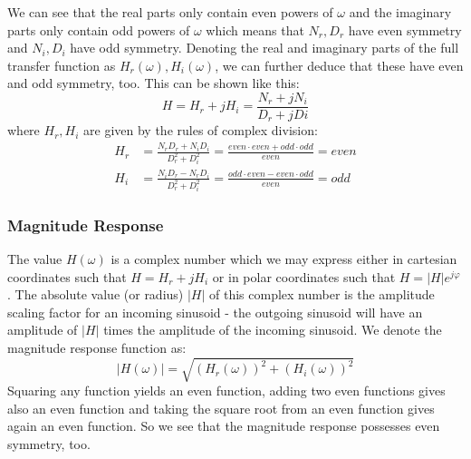 We can see that the real parts only contain even powers of $\omega$ and the imaginary parts only contain odd powers of $\omega$ which means that $N_r, D_r$ have even symmetry and $N_i, D_i$ have odd symmetry. Denoting the real and imaginary parts of the full transfer function as $H_r(\omega), H_i(\omega)$, we can further deduce that these have even and odd symmetry, too. This can be shown like this:
\begin{equation}
 H = H_r + j H_i = \frac{N_r + j N_i}{D_r + j Di} 
\end{equation} 
where $H_r, H_i$ are given by the rules of complex division:
\begin{equation}
\begin{aligned}
 H_r &= \frac{N_r D_r + N_i D_i}{D_r^2 + D_i^2} = \frac{even \cdot even + odd  \cdot odd}{even} = even \\
 H_i &= \frac{N_i D_r - N_r D_i}{D_r^2 + D_i^2} = \frac{odd  \cdot even - even \cdot odd}{even} = odd
\end{aligned}  
\end{equation} 

\subsubsection{Magnitude Response} 
The value $H(\omega)$ is a complex number which we may express either in cartesian coordinates such that $H = H_r + j H_i$ or in polar coordinates such that $H = |H| e^{j \varphi}$. The absolute value (or radius) $|H|$ of this complex number is the amplitude scaling factor for an incoming sinusoid - the outgoing sinusoid will have an amplitude of $|H|$ times the amplitude of the incoming sinusoid. We denote the magnitude response function as:
\begin{equation}
 |H(\omega)| = \sqrt{(H_r(\omega))^2 + (H_i(\omega))^2}
\end{equation} 
Squaring any function yields an even function, adding two even functions gives also an even function and taking the square root from an even function gives again an even function. So we see that the magnitude response possesses even symmetry, too. 

